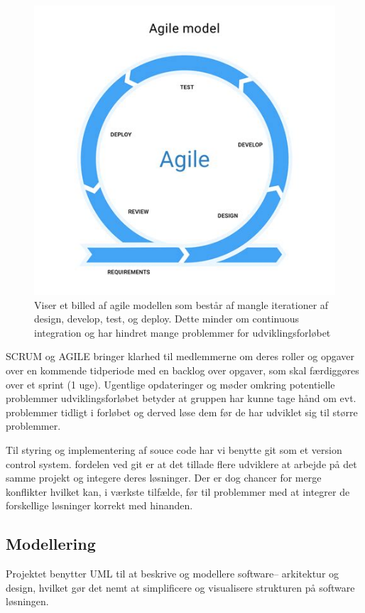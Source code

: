 \begin{figure}[H]
  \centering
  \includegraphics[scale=.5]{02-Body/Images/Agile.png}
  \caption{Viser et billed af agile modellen som består af mangle iterationer
           af design, develop, test, og deploy. Dette minder om continuous integration
           og har hindret mange problemmer for udviklingsforløbet}
  \label{fig:Agile}
\end{figure}

SCRUM og AGILE bringer klarhed til medlemmerne om deres roller og opgaver over en 
kommende tidperiode med en backlog over opgaver, som skal færdiggøres over et sprint (1 uge).
Ugentlige opdateringer og møder omkring potentielle problemmer udviklingsforløbet betyder
at gruppen har kunne tage hånd om evt. problemmer tidligt i forløbet og derved løse dem
før de har udviklet sig til større problemmer.

Til styring og implementering af souce code har vi benytte git som et version control system.
fordelen ved git er at det tillade flere udviklere at arbejde på det samme projekt og integere 
deres løsninger. Der er dog chancer for merge konflikter hvilket kan, i værkste tilfælde, før
til problemmer med at integrer de forskellige løsninger korrekt med hinanden.

\subsection{Modellering}
Projektet benytter UML til at beskrive og modellere software-- arkitektur
og design, hvilket gør det nemt at simplificere og visualisere strukturen på software
løsningen. 

